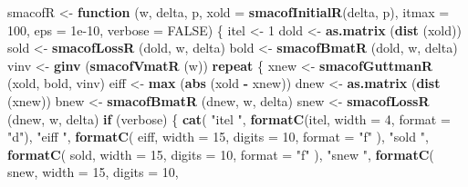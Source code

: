 \documentclass[12pt,]{article}
\newenvironment{Shaded}{\begin{snugshade}}{\end{snugshade}}
\newcommand{\KeywordTok}[1]{\textcolor[rgb]{0.13,0.29,0.53}{\textbf{#1}}}
\newcommand{\DataTypeTok}[1]{\textcolor[rgb]{0.13,0.29,0.53}{#1}}
\newcommand{\DecValTok}[1]{\textcolor[rgb]{0.00,0.00,0.81}{#1}}
\newcommand{\FloatTok}[1]{\textcolor[rgb]{0.00,0.00,0.81}{#1}}
\newcommand{\StringTok}[1]{\textcolor[rgb]{0.31,0.60,0.02}{#1}}
\newcommand{\OtherTok}[1]{\textcolor[rgb]{0.56,0.35,0.01}{#1}}
\newcommand{\ControlFlowTok}[1]{\textcolor[rgb]{0.13,0.29,0.53}{\textbf{#1}}}
\newcommand{\OperatorTok}[1]{\textcolor[rgb]{0.81,0.36,0.00}{\textbf{#1}}}
\newcommand{\NormalTok}[1]{#1}
\begin{document}
\begin{Shaded}
\begin{Highlighting}[]
{{{\NormalTok{smacofR <-}
\StringTok{  }\ControlFlowTok{function}\NormalTok{ (w,}
\NormalTok{            delta,}
\NormalTok{            p,}
            \DataTypeTok{xold =} \KeywordTok{smacofInitialR}\NormalTok{(delta, p),}
            \DataTypeTok{itmax =} \DecValTok{100}\NormalTok{,}
            \DataTypeTok{eps =} \FloatTok{1e-10}\NormalTok{,}
            \DataTypeTok{verbose =} \OtherTok{FALSE}\NormalTok{) \{}
\NormalTok{    itel <-}\StringTok{ }\DecValTok{1}
\NormalTok{    dold <-}\StringTok{ }\KeywordTok{as.matrix}\NormalTok{ (}\KeywordTok{dist}\NormalTok{ (xold))}
\NormalTok{    sold <-}\StringTok{ }\KeywordTok{smacofLossR}\NormalTok{ (dold, w, delta)}
\NormalTok{    bold <-}\StringTok{ }\KeywordTok{smacofBmatR}\NormalTok{ (dold, w, delta)}
\NormalTok{    vinv <-}\StringTok{ }\KeywordTok{ginv}\NormalTok{ (}\KeywordTok{smacofVmatR}\NormalTok{ (w))}
    \ControlFlowTok{repeat}\NormalTok{ \{}
\NormalTok{      xnew <-}\StringTok{ }\KeywordTok{smacofGuttmanR}\NormalTok{ (xold, bold, vinv)}
\NormalTok{      eiff <-}\StringTok{ }\KeywordTok{max}\NormalTok{ (}\KeywordTok{abs}\NormalTok{ (xold }\OperatorTok{-}\StringTok{ }\NormalTok{xnew))}
\NormalTok{      dnew <-}\StringTok{ }\KeywordTok{as.matrix}\NormalTok{ (}\KeywordTok{dist}\NormalTok{ (xnew))}
\NormalTok{      bnew <-}\StringTok{ }\KeywordTok{smacofBmatR}\NormalTok{ (dnew, w, delta)}
\NormalTok{      snew <-}\StringTok{ }\KeywordTok{smacofLossR}\NormalTok{ (dnew, w, delta)}
      \ControlFlowTok{if}\NormalTok{ (verbose) \{}
        \KeywordTok{cat}\NormalTok{(}
          \StringTok{"itel "}\NormalTok{,}
          \KeywordTok{formatC}\NormalTok{(itel, }\DataTypeTok{width =} \DecValTok{4}\NormalTok{, }\DataTypeTok{format =} \StringTok{"d"}\NormalTok{),}
          \StringTok{"eiff "}\NormalTok{,}
          \KeywordTok{formatC}\NormalTok{(}
\NormalTok{            eiff,}
            \DataTypeTok{width =} \DecValTok{15}\NormalTok{,}
            \DataTypeTok{digits =} \DecValTok{10}\NormalTok{,}
            \DataTypeTok{format =} \StringTok{"f"}
\NormalTok{          ),}
          \StringTok{"sold "}\NormalTok{,}
          \KeywordTok{formatC}\NormalTok{(}
\NormalTok{            sold,}
            \DataTypeTok{width =} \DecValTok{15}\NormalTok{,}
            \DataTypeTok{digits =} \DecValTok{10}\NormalTok{,}
            \DataTypeTok{format =} \StringTok{"f"}
\NormalTok{          ),}
          \StringTok{"snew "}\NormalTok{,}
          \KeywordTok{formatC}\NormalTok{(}
\NormalTok{            snew,}
            \DataTypeTok{width =} \DecValTok{15}\NormalTok{,}
            \DataTypeTok{digits =} \DecValTok{10}\NormalTok{,}
}}}
\end{Highlighting}
\end{Shaded}
\end{document}
